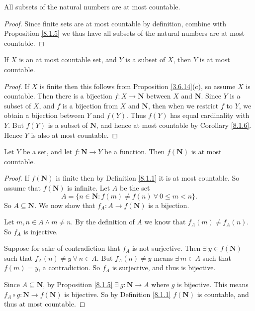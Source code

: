\begin{corollary}\label{8.1.6}
All subsets of the natural numbers are at most countable.
\end{corollary}

\begin{proof}
Since finite sets are at most countable by definition, combine with Proposition \ref{8.1.5} we thus have all subsets of the natural numbers are at most countable.
\end{proof}

\begin{corollary}\label{8.1.7}
If \(X\) is an at most countable set, and \(Y\) is a subset of \(X\), then \(Y\) is at most countable.
\end{corollary}

\begin{proof}
If \(X\) is finite then this follows from Proposition \ref{3.6.14}(c), so assume \(X\) is countable.
Then there is a bijection \(f : X \to \mathbf{N}\) between \(X\) and \(\mathbf{N}\).
Since \(Y\) is a subset of \(X\), and \(f\) is a bijection from \(X\) and \(\mathbf{N}\), then when we restrict \(f\) to \(Y\), we obtain a bijection between \(Y\) and \(f(Y)\).
Thus \(f(Y)\) has equal cardinality with \(Y\).
But \(f(Y)\) is a subset of \(\mathbf{N}\), and hence at most countable by Corollary \ref{8.1.6}.
Hence \(Y\) is also at most countable.
\end{proof}

\begin{proposition}\label{8.1.8}
Let \(Y\) be a set, and let \(f : \mathbf{N} \to Y\) be a function.
Then \(f(\mathbf{N})\) is at most countable.
\end{proposition}

\begin{proof}
If \(f(\mathbf{N})\) is finite then by Definition \ref{8.1.1} it is at most countable.
So assume that \(f(\mathbf{N})\) is infinite.
Let \(A\) be the set
\[
    A = \{n \in \mathbf{N} : f(m) \neq f(n) \ \forall\ 0 \leq m < n\}.
\]
So \(A \subseteq \mathbf{N}\).
We now show that \(f_A : A \to f(\mathbf{N})\) is a bijection.

Let \(m, n \in A \land m \neq n\).
By the definition of \(A\) we know that \(f_A(m) \neq f_A(n)\).
So \(f_A\) is injective.

Suppose for sake of contradiction that \(f_A\) is not surjective.
Then \(\exists\ y \in f(\mathbf{N})\) such that \(f_A(n) \neq y \ \forall\ n \in A\).
But \(f_A(n) \neq y\) means \(\exists\ m \in A\) such that \(f(m) = y\), a contradiction.
So \(f_A\) is surjective, and thus is bijective.

Since \(A \subseteq \mathbf{N}\), by Proposition \ref{8.1.5} \(\exists\ g : \mathbf{N} \to A\) where \(g\) is bijective.
This means \(f_A \circ g : \mathbf{N} \to f(\mathbf{N})\) is bijective.
So by Definition \ref{8.1.1} \(f(\mathbf{N})\) is countable, and thus at most countable.
\end{proof}

